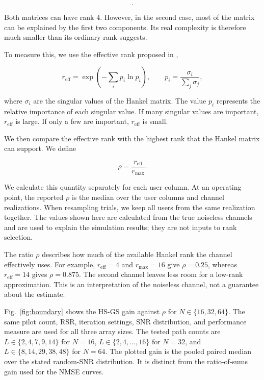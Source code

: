 \documentclass[journal]{IEEEtran}
\begin{document}
\begin{equation}
[10,\;8,\;0.2,\;0.1].
\end{equation}

Both matrices can have rank $4$. However, in the second case, most of the
matrix can be explained by the first two components. Its real complexity
is therefore much smaller than its ordinary rank suggests.

To measure this, we use the effective rank proposed in
\cite{royvetterli2007},

\begin{equation}
r_{\mathrm{eff}}
=
\exp
\left(
-\sum_i p_i\ln p_i
\right),
\qquad
p_i
=
\frac{\sigma_i}{\sum_j\sigma_j},
\end{equation}

where $\sigma_i$ are the singular values of the Hankel matrix. The value
$p_i$ represents the relative importance of each singular value. If many
singular values are important, $r_{\mathrm{eff}}$ is large. If only a few
are important, $r_{\mathrm{eff}}$ is small.

We then compare the effective rank with the highest rank that the Hankel
matrix can support. We define

\begin{equation}
\rho
=
\frac{r_{\mathrm{eff}}}{r_{\max}}.
\end{equation}

We calculate this quantity separately for each user column. At an
operating point, the reported $\rho$ is the median over the user columns
and channel realizations. When resampling trials, we keep all users from
the same realization together. The values shown here are calculated from
the true noiseless channels and are used to explain the simulation results;
they are not inputs to rank selection.

The ratio $\rho$ describes how much of the available Hankel rank the
channel effectively uses. For example, $r_{\mathrm{eff}}=4$ and
$r_{\max}=16$ give $\rho=0.25$, whereas $r_{\mathrm{eff}}=14$ gives
$\rho=0.875$. The second channel leaves less room for a low-rank
approximation. This is an interpretation of the noiseless channel, not
a guarantee about the estimate.

Fig.~\ref{fig:boundary} shows the HS-GS gain against $\rho$ for
$N\in\{16,32,64\}$. The same pilot count, RSR, iteration settings, SNR
distribution, and performance measure are used for all three array sizes.
The tested path counts are $L\in\{2,4,7,9,14\}$ for $N=16$,
$L\in\{2,4,\ldots,16\}$ for $N=32$, and
$L\in\{8,14,29,38,48\}$ for $N=64$. The plotted gain is the pooled
paired median over the stated random-SNR distribution. It is distinct
from the ratio-of-sums gain used for the NMSE curves.
\end{document}
